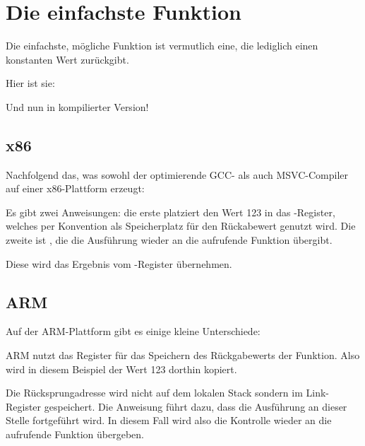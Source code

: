 \section{Die einfachste Funktion}

Die einfachste, mögliche Funktion ist vermutlich eine, die lediglich einen konstanten Wert zurückgibt.

Hier ist sie:



Und nun in kompilierter Version!

\subsection{x86}

Nachfolgend das, was sowohl der optimierende GCC- als auch MSVC-Compiler auf einer x86-Plattform erzeugt:



Es gibt zwei Anweisungen: die erste platziert den Wert 123 in das \EAX-Register, welches per Konvention
als Speicherplatz für den Rückabewert genutzt wird. Die zweite ist \RET, die die Ausführung wieder an
die aufrufende Funktion übergibt.

Diese wird das Ergebnis vom \EAX-Register übernehmen.

\subsection{ARM}

Auf der ARM-Plattform gibt es einige kleine Unterschiede:



ARM nutzt das Register  für das Speichern des Rückgabewerts der Funktion. Also wird in diesem Beispiel
der Wert 123 dorthin kopiert.

Die Rücksprungadresse wird nicht auf dem lokalen Stack sondern im Link-Register gespeichert.
Die Anweisung  führt dazu, dass die Ausführung an dieser Stelle fortgeführt wird. In diesem Fall wird
also die Kontrolle wieder an die aufrufende Funktion übergeben.

